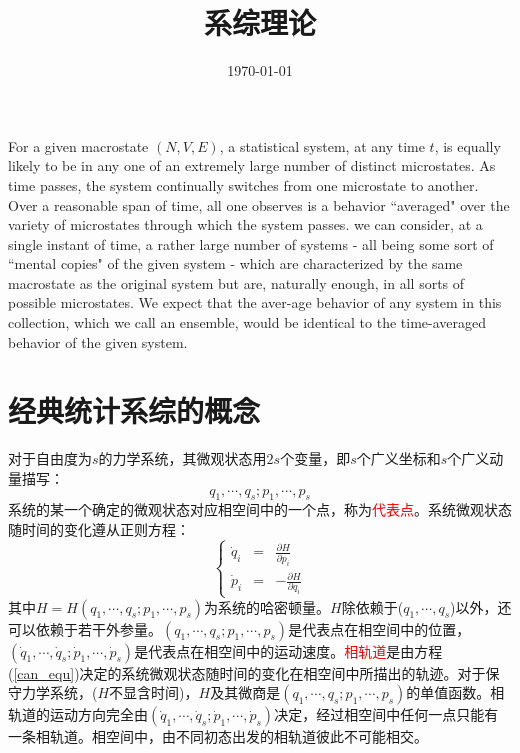 \documentclass[12pt,a4paper]{article}
\title{系综理论}
\author{}
\date{\today}
\begin{document}
\maketitle

\cite{pathria1996statistical} For a given macrostate $(N,V,E)$, a statistical system, at any time $t$, is equally likely to be in any one of an extremely large number of distinct microstates. As time passes, the system continually switches from one microstate to another. Over a reasonable span of time, all one observes is a behavior ``averaged" over the variety of microstates through which the system passes. we can consider, at a single instant of time, a rather large number of systems - all being some sort of ``mental copies" of the given system - which are characterized by the same macrostate as the original system but are, naturally enough, in all sorts of possible microstates. We expect that the aver-age behavior of any system in this collection, which we call an ensemble, would be identical to the time-averaged behavior of the given system.

\section{经典统计系综的概念}
对于自由度为$s$的力学系统，其微观状态用$2s$个变量，即$s$个广义坐标和$s$个广义动量描写：
\begin{equation}
q_1, \cdots, q_s; p_1, \cdots, p_s
\end{equation}
系统的某一个确定的微观状态对应相空间中的一个点，称为\textcolor{red}{代表点}。系统微观状态随时间的变化遵从正则方程：
\begin{equation}
\left\{
\begin{aligned}
\dot{q}_i & = & \frac{\partial H}{\partial p_i} \\
\dot{p}_i & = & -\frac{\partial H}{\partial q_i}
\end{aligned}
\right.
\label{can_equ}
\end{equation}
其中$H=H(q_1, \cdots, q_s; p_1, \cdots, p_s)$为系统的哈密顿量。$H$除依赖于($q_1, \cdots, q_s$)以外，还可以依赖于若干外参量。$(q_1, \cdots, q_s; p_1, \cdots, p_s)$是代表点在相空间中的位置，$(\dot{q}_1, \cdots, \dot{q}_s; \dot{p}_1, \cdots, \dot{p}_s)$是代表点在相空间中的运动速度。\textcolor{red}{相轨道}是由方程(\ref{can_equ})决定的系统微观状态随时间的变化在相空间中所描出的轨迹。对于保守力学系统，($H$不显含时间)，$H$及其微商是$(q_1, \cdots, q_s; p_1, \cdots, p_s)$的单值函数。相轨道的运动方向完全由$(\dot{q}_1, \cdots, \dot{q}_s; \dot{p}_1, \cdots, \dot{p}_s)$决定，经过相空间中任何一点只能有一条相轨道。相空间中，由不同初态出发的相轨道彼此不可能相交。
\end{document}
